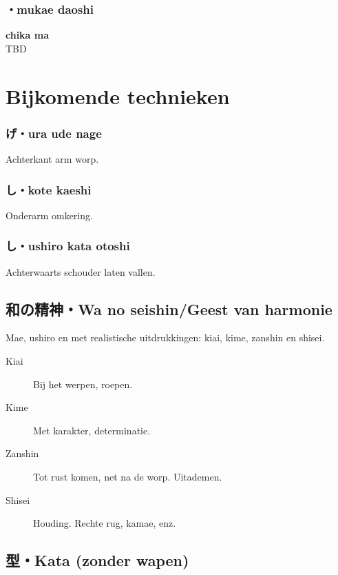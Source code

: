 \subsubsection{\ruby{}{}\ruby{}{}・mukae daoshi}
\textbf{chika ma}\\
TBD

\section{Bijkomende technieken}
\subsubsection{げ・ura ude nage}
Achterkant arm worp.

\subsubsection{し・kote kaeshi}
Onderarm omkering.

\subsubsection{し・ushiro kata otoshi}
Achterwaarts schouder laten vallen.

\subsection{和の精神・Wa no seishin/Geest van harmonie}
Mae, ushiro en met realistische uitdrukkingen: kiai, kime, zanshin en shisei.\\
\begin{description}
    \item[Kiai] Bij het werpen, roepen.
    \item[Kime] Met karakter, determinatie.
    \item[Zanshin] Tot rust komen, net na de worp. Uitademen.
    \item[Shisei] Houding. Rechte rug, kamae, enz.
\end{description}

\subsection{型・Kata (zonder wapen)}

